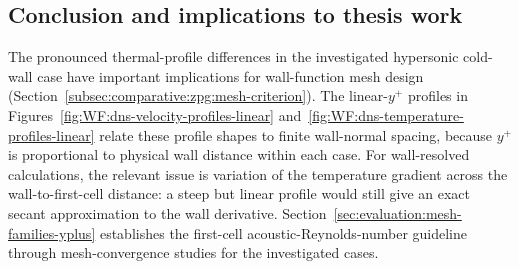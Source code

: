 \subsection{Conclusion and implications to thesis work}

The pronounced thermal-profile differences in the investigated hypersonic cold-wall case have important implications for wall-function mesh design (Section~\ref{subsec:comparative:zpg:mesh-criterion}). The linear-\(y^+\) profiles in Figures~\ref{fig:WF:dns-velocity-profiles-linear} and~\ref{fig:WF:dns-temperature-profiles-linear} relate these profile shapes to finite wall-normal spacing, because \(y^+\) is proportional to physical wall distance within each case. For wall-resolved calculations, the relevant issue is variation of the temperature gradient across the wall-to-first-cell distance: a steep but linear profile would still give an exact secant approximation to the wall derivative. Section~\ref{sec:evaluation:mesh-families-yplus} establishes the first-cell acoustic-Reynolds-number guideline through mesh-convergence studies for the investigated cases.